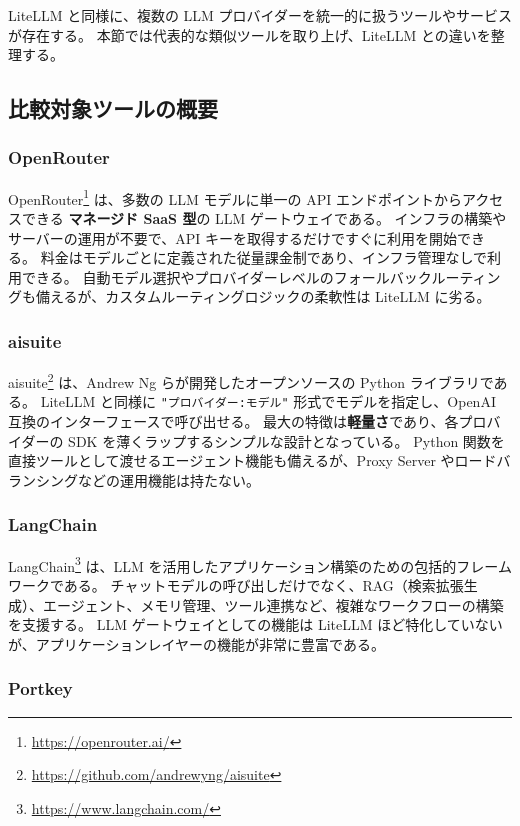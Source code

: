 \documentclass[a4paper,11pt]{ltjsarticle}
\newcommand{\code}[1]{\texttt{#1}}
\begin{document}
LiteLLM と同様に、複数の LLM プロバイダーを統一的に扱うツールやサービスが存在する。
本節では代表的な類似ツールを取り上げ、LiteLLM との違いを整理する。

\subsection{比較対象ツールの概要}

\subsubsection{OpenRouter}

OpenRouter\footnote{\url{https://openrouter.ai/}} は、多数の LLM モデルに単一の API エンドポイントからアクセスできる \textbf{マネージド SaaS 型}の LLM ゲートウェイである。
インフラの構築やサーバーの運用が不要で、API キーを取得するだけですぐに利用を開始できる。
料金はモデルごとに定義された従量課金制であり、インフラ管理なしで利用できる。
自動モデル選択やプロバイダーレベルのフォールバックルーティングも備えるが、カスタムルーティングロジックの柔軟性は LiteLLM に劣る。

\subsubsection{aisuite}

aisuite\footnote{\url{https://github.com/andrewyng/aisuite}} は、Andrew Ng らが開発したオープンソースの Python ライブラリである。
LiteLLM と同様に \code{"プロバイダー:モデル"} 形式でモデルを指定し、OpenAI 互換のインターフェースで呼び出せる。
最大の特徴は\textbf{軽量さ}であり、各プロバイダーの SDK を薄くラップするシンプルな設計となっている。
Python 関数を直接ツールとして渡せるエージェント機能も備えるが、Proxy Server やロードバランシングなどの運用機能は持たない。

\subsubsection{LangChain}

LangChain\footnote{\url{https://www.langchain.com/}} は、LLM を活用したアプリケーション構築のための包括的フレームワークである。
チャットモデルの呼び出しだけでなく、RAG（検索拡張生成）、エージェント、メモリ管理、ツール連携など、複雑なワークフローの構築を支援する。
LLM ゲートウェイとしての機能は LiteLLM ほど特化していないが、アプリケーションレイヤーの機能が非常に豊富である。

\subsubsection{Portkey}
\end{document}
